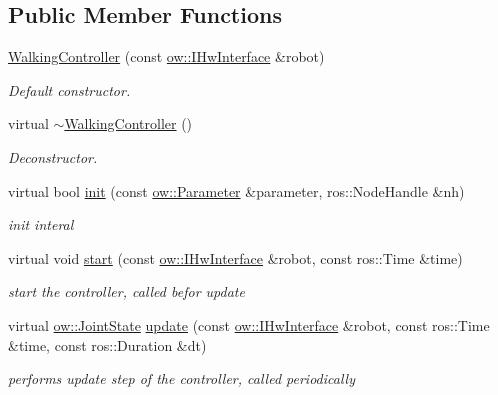 \subsection*{Public Member Functions}
\begin{DoxyCompactItemize}
\item 
\hyperlink{classow__controller_1_1WalkingController_a3002d68f9e35844654d224ed3460b63a}{Walking\+Controller} (const \hyperlink{classow_1_1IHwInterface}{ow\+::\+I\+Hw\+Interface} \&robot)
\begin{DoxyCompactList}\small\item\em Default constructor. \end{DoxyCompactList}\item 
virtual \hyperlink{classow__controller_1_1WalkingController_af057776d1ab03da888a0fd353f4e6b96}{$\sim$\+Walking\+Controller} ()\hypertarget{classow__controller_1_1WalkingController_af057776d1ab03da888a0fd353f4e6b96}{}\label{classow__controller_1_1WalkingController_af057776d1ab03da888a0fd353f4e6b96}

\begin{DoxyCompactList}\small\item\em Deconstructor. \end{DoxyCompactList}\item 
virtual bool \hyperlink{classow__controller_1_1WalkingController_a0e9637665918f28e5e28b7ee24a119df}{init} (const \hyperlink{classow_1_1Parameter}{ow\+::\+Parameter} \&parameter, ros\+::\+Node\+Handle \&nh)
\begin{DoxyCompactList}\small\item\em init interal \end{DoxyCompactList}\item 
virtual void \hyperlink{classow__controller_1_1WalkingController_a3ce7ad45b92396df9e00feb778c19507}{start} (const \hyperlink{classow_1_1IHwInterface}{ow\+::\+I\+Hw\+Interface} \&robot, const ros\+::\+Time \&time)
\begin{DoxyCompactList}\small\item\em start the controller, called befor update \end{DoxyCompactList}\item 
virtual \hyperlink{classow__core_1_1JointState}{ow\+::\+Joint\+State} \hyperlink{classow__controller_1_1WalkingController_a0a53db483d4499430a7f2c4915972957}{update} (const \hyperlink{classow_1_1IHwInterface}{ow\+::\+I\+Hw\+Interface} \&robot, const ros\+::\+Time \&time, const ros\+::\+Duration \&dt)
\begin{DoxyCompactList}\small\item\em performs update step of the controller, called periodically \end{DoxyCompactList}\end{DoxyCompactItemize}
